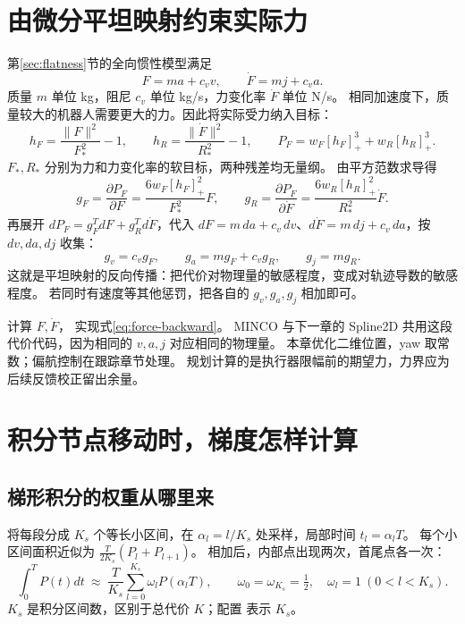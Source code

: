 \section{由微分平坦映射约束实际力}\label{sec:flatcost}
第\ref{sec:flatness}节的全向惯性模型满足
\[
 F=ma+c_vv,\qquad \dot F=mj+c_va.
\]
质量 $m$ 单位 kg，阻尼 $c_v$ 单位 kg/s，力变化率 $\dot F$ 单位 N/s。
相同加速度下，质量较大的机器人需要更大的力。因此将实际受力纳入目标：
\begin{equation}
 h_F=\frac{\|F\|^2}{F_*^2}-1,\qquad
 h_R=\frac{\|\dot F\|^2}{R_*^2}-1,\qquad
 P_F=w_F[h_F]_+^3+w_R[h_R]_+^3.
\end{equation}
$F_*,R_*$ 分别为力和力变化率的软目标，两种残差均无量纲。
由平方范数求导得
\[
 g_F=\frac{\partial P_F}{\partial F}=\frac{6w_F[h_F]_+^2}{F_*^2}F,
 \qquad
 g_R=\frac{\partial P_F}{\partial\dot F}=\frac{6w_R[h_R]_+^2}{R_*^2}\dot F.
\]
再展开 $dP_F=g_F^TdF+g_R^Td\dot F$，代入
$dF=m\,da+c_v\,dv$、$d\dot F=m\,dj+c_v\,da$，按 $dv,da,dj$ 收集：
\begin{equation}
 g_v=c_vg_F,\qquad g_a=mg_F+c_vg_R,\qquad g_j=mg_R.
 \label{eq:force-backward}
\end{equation}
这就是平坦映射的反向传播：把代价对物理量的敏感程度，变成对轨迹导数的敏感程度。
若同时有速度等其他惩罚，把各自的 $g_v,g_a,g_j$ 相加即可。

 计算 $F,\dot F$， 实现式\eqref{eq:force-backward}。
MINCO 与下一章的 Spline2D 共用这段代价代码，因为相同的 $v,a,j$ 对应相同的物理量。
本章优化二维位置，yaw 取常数；偏航控制在跟踪章节处理。
规划计算的是执行器限幅前的期望力，力界应为后续反馈校正留出余量。

\section{积分节点移动时，梯度怎样计算}
\subsection{梯形积分的权重从哪里来}
将每段分成 $K_s$ 个等长小区间，在 $\alpha_l=l/K_s$ 处采样，局部时间 $t_l=\alpha_lT$。
每个小区间面积近似为 $\tfrac{T}{2K_s}(P_l+P_{l+1})$。
相加后，内部点出现两次，首尾点各一次：
\[
 \int_0^T P(t)dt\ \approx\ \frac{T}{K_s}\sum_{l=0}^{K_s}\omega_lP(\alpha_lT),
 \qquad \omega_0=\omega_{K_s}=\tfrac12,\quad\omega_l=1\ (0<l<K_s).
\]
$K_s$ 是积分区间数，区别于总代价 $K$；配置  表示 $K_s$。

